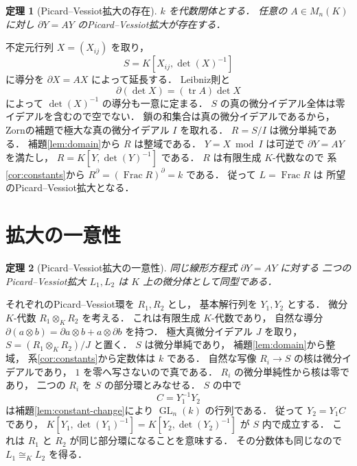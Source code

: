 \documentclass[a5paper,10pt,onecolumn]{jsarticle}
\makeatletter
\theoremstyle{mathnotetheorem}
\newtheorem{theorem}{定理}[section]
\renewcommand{\proofname}{証明}
\renewenvironment{proof}[1][\proofname]{%
  \par\pushQED{\qed}\normalfont\topsep4\p@\@plus2\p@\relax
  \trivlist\item[\hskip\labelsep\bfseries #1]\ignorespaces
}{\popQED\endtrivlist\@endpefalse}
\makeatother
\begin{document}
\begin{theorem}[Picard--Vessiot拡大の存在]
\label{thm:pv-existence}
$k$ を代数閉体とする．
任意の $A\in M_n(K)$ に対し
$\partial Y=AY$ のPicard--Vessiot拡大が存在する．
\end{theorem}
\begin{proof}
不定元行列 $X=(X_{ij})$ を取り，
\[
 S=K[X_{ij},\det(X)^{-1}]
\]
に導分を $\partial X=AX$ によって延長する．
Leibniz則と
\[
 \partial(\det X)=(\operatorname{tr}A)\det X
\]
によって $\det(X)^{-1}$ の導分も一意に定まる．
$S$ の真の微分イデアル全体は零イデアルを含むので空でない．
鎖の和集合は真の微分イデアルであるから，
Zornの補題で極大な真の微分イデアル $I$ を取れる．
$R=S/I$ は微分単純である．
補題\ref{lem:domain}から $R$ は整域である．
$Y=X\bmod I$ は可逆で
$\partial Y=AY$ を満たし，
$R=K[Y,\det(Y)^{-1}]$ である．
$R$ は有限生成 $K$-代数なので
系\ref{cor:constants}から
$R^\partial=(\operatorname{Frac}R)^\partial=k$ である．
従って $L=\operatorname{Frac}R$ は
所望のPicard--Vessiot拡大となる．
\end{proof}

\section{拡大の一意性}

\begin{theorem}[Picard--Vessiot拡大の一意性]
\label{thm:pv-uniqueness}
同じ線形方程式 $\partial Y=AY$ に対する
二つのPicard--Vessiot拡大 $L_1,L_2$ は
$K$ 上の微分体として同型である．
\end{theorem}
\begin{proof}
それぞれのPicard--Vessiot環を $R_1,R_2$ とし，
基本解行列を $Y_1,Y_2$ とする．
微分 $K$-代数
$R_1\otimes_KR_2$ を考える．
これは有限生成 $K$-代数であり，
自然な導分
$\partial(a\otimes b)=\partial a\otimes b+a\otimes\partial b$
を持つ．
極大真微分イデアル $J$ を取り，
$S=(R_1\otimes_KR_2)/J$ と置く．
$S$ は微分単純であり，
補題\ref{lem:domain}から整域，
系\ref{cor:constants}から定数体は $k$ である．
自然な写像 $R_i\to S$ の核は微分イデアルであり，
$1$ を零へ写さないので真である．
$R_i$ の微分単純性から核は零であり，
二つの $R_i$ を $S$ の部分環とみなせる．
$S$ の中で
\[
 C=Y_1^{-1}Y_2
\]
は補題\ref{lem:constant-change}により
$\operatorname{GL}_n(k)$ の行列である．
従って $Y_2=Y_1C$ であり，
$K[Y_1,\det(Y_1)^{-1}]
 =K[Y_2,\det(Y_2)^{-1}]$
が $S$ 内で成立する．
これは $R_1$ と $R_2$ が同じ部分環になることを意味する．
その分数体も同じなので
$L_1\cong_KL_2$ を得る．
\end{proof}
\end{document}
